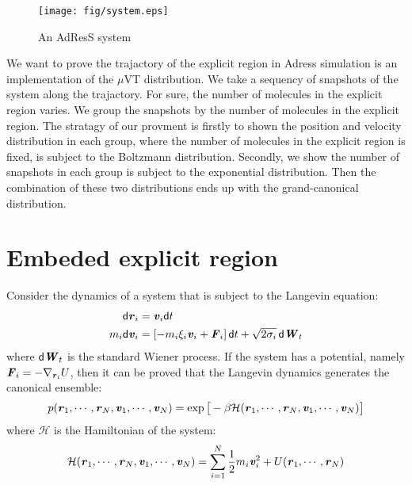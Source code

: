 \documentclass[aps,pre,preprint]{revtex4}
\renewcommand{\v}[1]{\textbf{\textit{#1}}}
\renewcommand{\d}[1]{\textsf{#1}}
\begin{document}



\begin{figure}
  \centering
  \texttt{[image: fig/system.eps]}
  \caption{An AdResS system}
  \label{fig:tmp1}
\end{figure}


We want to prove the trajactory of the explicit region in Adress
simulation is an implementation of the $\mu$VT distribution. We take a
sequency of snapshots of the system along the trajactory.  For sure,
the number of molecules in the explicit region varies. We group the
snapshots by the number of molecules in the explicit region.  The
stratagy of our provment is firstly to shown the position and
velocity distribution in each group, where the number of molecules
in the explicit region is fixed, is subject to the Boltzmann
distribution. Secondly, we show the number of snapshots in each group
is subject to the exponential distribution. Then the combination of
these two distributions ends up with the grand-canonical distribution.

\section{Embeded explicit region}

Consider the dynamics of a system that is subject to the Langevin equation:
\begin{align}
  \d d\v r_i &= \v v_i\d dt\\
  m_i\d d\v v_i &= [-m_i\xi_i\v v_i + \v F_i]\,\d dt + \sqrt{2\sigma_i}\,\d d\v W_t
\end{align}
where $\d d\v W_t$ is the standard Wiener process.  If the system has a
potential, namely $\v F_i = -\nabla_{\v r_i}U$, then it can be proved that the
Langevin dynamics generates the canonical ensemble:
\begin{align}
  p(\v r_1, \cdots, \v r_N, \v v_1, \cdots, \v v_N)
  = \exp\big[
  -\beta \mathcal H(\v r_1, \cdots, \v r_N, \v v_1, \cdots, \v v_N)
  \big]
\end{align}
where $\mathcal H$ is the Hamiltonian of the system:
\begin{align}
  \mathcal H(\v r_1, \cdots, \v r_N, \v v_1, \cdots, \v v_N)
  =
  \sum_{i=1}^N\frac12 m_i\v v_i^2 + U(\v r_1, \cdots, \v r_N)  
\end{align}
\end{document}
